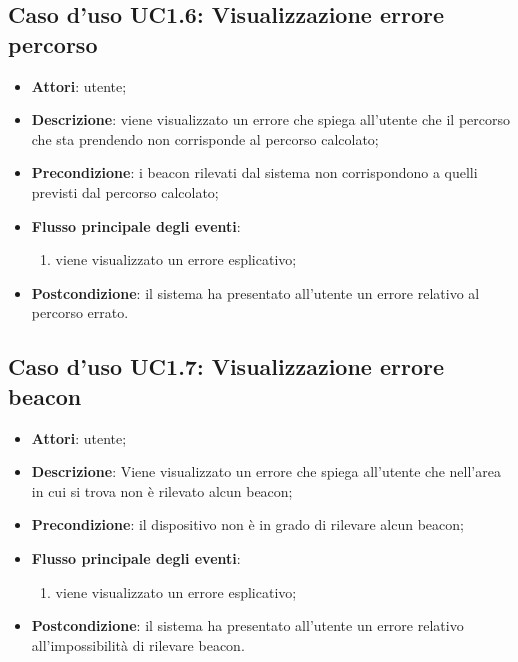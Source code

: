 \documentclass[../AnalisiDeiRequisiti.tex]{subfiles}
\begin{document}
\subsection{Caso d'uso UC1.6: Visualizzazione errore percorso}
\begin{itemize}
\item \textbf{Attori}: utente;
\item \textbf{Descrizione}: viene visualizzato un errore che spiega all'utente che il percorso che sta prendendo non corrisponde al percorso calcolato; 
      \item \textbf{Precondizione}: i beacon rilevati dal sistema non corrispondono a quelli previsti dal percorso calcolato;

        \item \textbf{Flusso principale degli eventi}:
          \begin{enumerate}
          \item viene visualizzato un errore esplicativo;

      \end{enumerate}
    \item \textbf{Postcondizione}: il sistema ha presentato all'utente un errore relativo al percorso errato.
  \end{itemize}
\hypertarget{UC1.7}{}
\subsection{Caso d'uso UC1.7: Visualizzazione errore beacon}
\begin{itemize}
\item \textbf{Attori}: utente;
\item \textbf{Descrizione}: Viene visualizzato un errore che spiega all'utente che nell'area in cui si trova non è rilevato alcun beacon; 
      \item \textbf{Precondizione}: il dispositivo non è in grado di rilevare alcun beacon;

        \item \textbf{Flusso principale degli eventi}:
          \begin{enumerate}
          \item viene visualizzato un errore esplicativo;

      \end{enumerate}
    \item \textbf{Postcondizione}: il sistema ha presentato all'utente un errore relativo all'impossibilità di rilevare beacon.
  \end{itemize}
\hypertarget{UC2}{}
\end{document}
